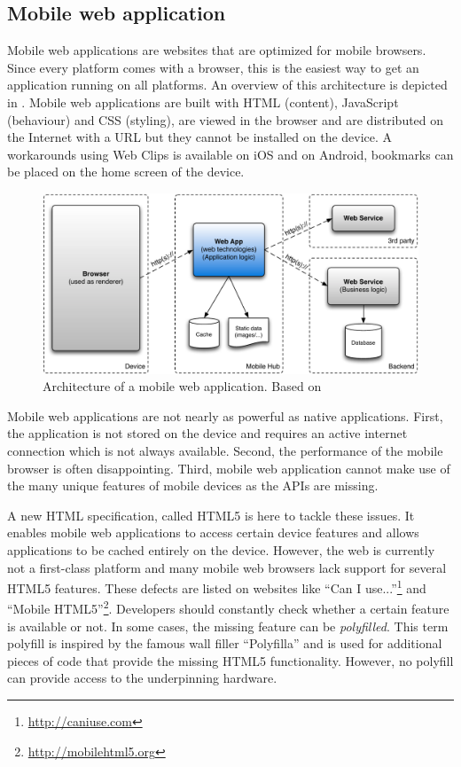 \subsection{Mobile web application}

Mobile web applications are websites that are optimized for mobile browsers. Since every platform comes with a browser, this is the easiest way to get an application running on all platforms. An overview of this architecture is depicted in . Mobile web applications are built with HTML (content), JavaScript (behaviour) and CSS (styling), are viewed in the browser and are distributed on the Internet with a URL but they cannot be installed on the device. A workarounds using Web Clips \cite{Safari:webclips} is available on iOS and on Android, bookmarks can be placed on the home screen of the device. 

\begin{figure}[h]
    \begin{center}
        \includegraphics[width=\textwidth]{figs/web.pdf}
        \caption{Architecture of a mobile web application. Based on \cite{Friese}}
        \label{fig:web}
    \end{center}
\end{figure}

Mobile web applications are not nearly as powerful as native applications. First, the application is not stored on the device and requires an active internet connection which is not always available. Second, the performance of the mobile browser is often disappointing. Third, mobile web application cannot make use of the many unique features of mobile devices as the APIs are missing.

A new HTML specification, called HTML5 is here to tackle these issues. It enables mobile web applications to access certain device features and allows applications to be cached entirely on the device. However, the web is currently not a first-class platform and many mobile web browsers lack support for several HTML5 features. These defects are listed on websites like ``Can I use...''\footnote{\url{http://caniuse.com}} and ``Mobile HTML5''\footnote{\url{http://mobilehtml5.org}}. Developers should constantly check whether a certain feature is available or not. In some cases, the missing feature can be \emph{polyfilled}. This term polyfill is inspired by the famous wall filler ``Polyfilla'' and is used for additional pieces of code that provide the missing HTML5 functionality. However, no polyfill can provide access to the underpinning hardware. 

